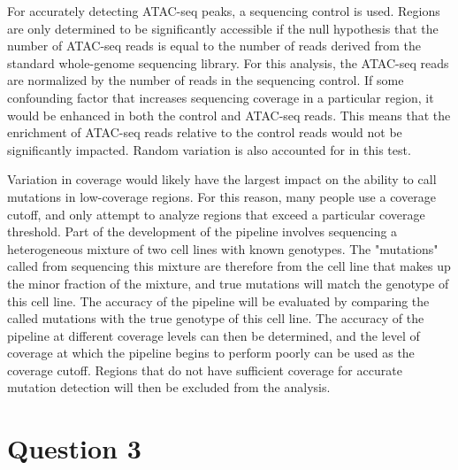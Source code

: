 For accurately detecting ATAC-seq peaks, a sequencing control is used.
Regions are only determined to be significantly accessible if the null hypothesis that the number of ATAC-seq reads is equal to the number of reads derived from the standard whole-genome sequencing library.
For this analysis, the ATAC-seq reads are normalized by the number of reads in the sequencing control.
If some confounding factor that increases sequencing coverage in a particular region, it would be enhanced in both the control and ATAC-seq reads. This means that the enrichment of ATAC-seq reads relative to the control reads would not be significantly impacted. Random variation is also accounted for in this test.

Variation in coverage would likely have the largest impact on the ability to call mutations in low-coverage regions. For this reason, many people use a coverage cutoff, and only attempt to analyze regions that exceed a particular coverage threshold. Part of the development of the pipeline involves sequencing a heterogeneous mixture of two cell lines with known genotypes. The "mutations" called from sequencing this mixture are therefore from the cell line that makes up the minor fraction of the mixture, and true mutations will match the genotype of this cell line. The accuracy of the pipeline will be evaluated by comparing the called mutations with the true genotype of this cell line. The accuracy of the pipeline at different coverage levels can then be determined, and the level of coverage at which the pipeline begins to perform poorly can be used as the coverage cutoff. Regions that do not have sufficient coverage for accurate mutation detection will then be excluded from the analysis.


\section{Question 3}





